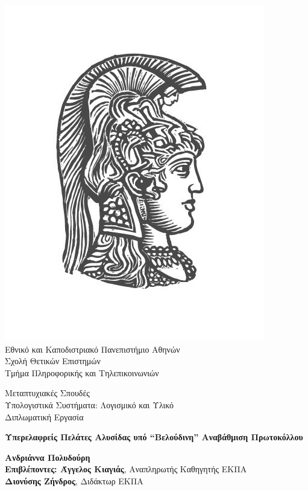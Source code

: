 \begin{center}
    
    \includegraphics[scale=0.8]{figures/logo_uoa.jpg}\\
    {\large Εθνικό και Καποδιστριακό Πανεπιστήμιο Αθηνών \\ 
    Σχολή Θετικών Επιστημών \\ 
    Τμήμα Πληροφορικής και Τηλεπικοινωνιών\\}
    \vspace{1cm}
    \begin{LARGE}
        Μεταπτυχιακές Σπουδές \\ 
        Υπολογιστικά Συστήματα: Λογισμικό και Υλικό\\
        \vspace{10mm}
        {Διπλωματική Εργασία}\\
        \vspace{0.8cm}
    \end{LARGE}
    {\textbf{\LARGE Υπερελαφρείς Πελάτες Αλυσίδας υπό ``Βελούδινη'' Αναβάθμιση Πρωτοκόλλου}}\\
    \vspace{2.5cm}


    \textbf{\large Ανδριάννα Πολυδούρη} \\ 
    \vspace{2.5cm} 
    \textbf{\large Επιβλέποντες: Άγγελος Κιαγιάς}\large , Αναπληρωτής Καθηγητής ΕΚΠΑ\\
    \hspace{0.77cm}
    \textbf{\large Διονύσης Ζήνδρος}\large, Διδάκτωρ ΕΚΠΑ
    \vspace{2cm}

    \date{Αθήνα, \\ Ιούνιος 2020}
    \pagebreak
\end{center}